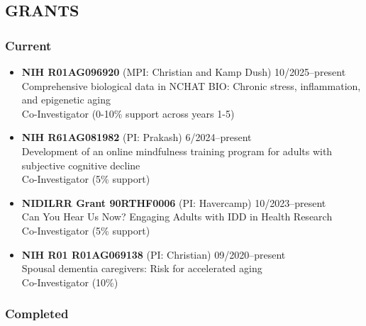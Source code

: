 \documentclass[
  english,
  letterpaper,
  DIV=11,
  numbers=noendperiod]{scrartcl}
\providecommand{\tightlist}{%
  \setlength{\itemsep}{0pt}\setlength{\parskip}{0pt}}
\begin{document}
\subsection{GRANTS}\label{grants}

\subsubsection{Current}\label{current}

\begin{itemize}
\tightlist
\item
  \textbf{NIH R01AG096920} (MPI: Christian and Kamp Dush)
  {10/2025--present}\\
  Comprehensive biological data in NCHAT BIO: Chronic stress,
  inflammation, and epigenetic aging\\
  Co-Investigator (0-10\% support across years 1-5)
\item
  \textbf{NIH R61AG081982} (PI: Prakash) {6/2024--present}\\
  Development of an online mindfulness training program for adults with
  subjective cognitive decline\\
  Co-Investigator (5\% support)
\item
  \textbf{NIDILRR Grant 90RTHF0006} (PI: Havercamp) {10/2023--present}\\
  Can You Hear Us Now? Engaging Adults with IDD in Health Research\\
  Co-Investigator (5\% support)
\item
  \textbf{NIH R01 R01AG069138} (PI: Christian) {09/2020--present}\\
  Spousal dementia caregivers: Risk for accelerated aging\\
  Co-Investigator (10\%)
\end{itemize}

\subsubsection{Completed}\label{completed}
\end{document}
